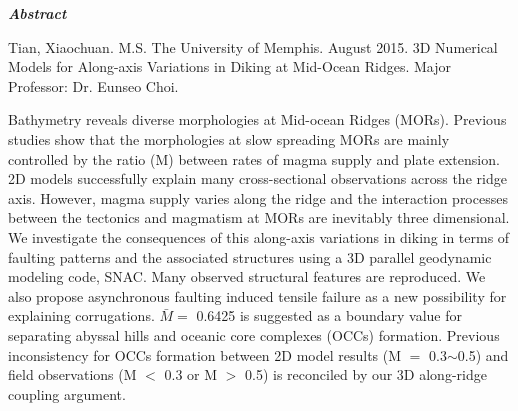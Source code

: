 \begin{center}
\textbf{\textit{\large{Abstract}}}
\end{center}

\vspace{0.5cm}

\begin{singlespace*}
Tian, Xiaochuan. M.S. The University of Memphis. August 2015. 3D Numerical Models for Along-axis Variations in Diking at Mid-Ocean Ridges. Major Professor: Dr. Eunseo Choi.
\end{singlespace*}

\vspace{0.5cm}

Bathymetry reveals diverse morphologies at Mid-ocean Ridges (MORs). Previous studies show that the morphologies at slow spreading MORs are mainly controlled by the ratio (M) between rates of magma supply and plate extension. 2D models successfully explain many cross-sectional observations across the ridge axis. However, magma supply varies along the ridge and the interaction processes between the tectonics and magmatism at MORs are inevitably three dimensional. We investigate the consequences of this along-axis variations in diking in terms of faulting patterns and the associated structures using a 3D parallel geodynamic modeling code, SNAC. Many observed structural features are reproduced. We also propose asynchronous faulting induced tensile failure as a new possibility for explaining corrugations. $\bar{M} =$ 0.6425 is suggested as a boundary value for separating abyssal hills and oceanic core complexes (OCCs) formation. Previous inconsistency for OCCs formation between 2D model results (M $=$ 0.3$\sim$0.5) and field observations (M $<$ 0.3 or M $>$ 0.5) is reconciled by our 3D along-ridge coupling argument.  

